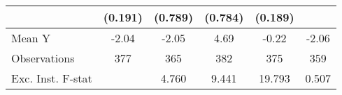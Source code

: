 {\begin{tabular}{l*{5}{c}}
            &     (0.191)         &     (0.789)         &     (0.784)         &     (0.189)         &                     \\
\midrule
Mean Y      &       -2.04         &       -2.05         &        4.69         &       -0.22         &       -2.06         \\
Observations&         377         &         365         &         382         &         375         &         359         \\
Exc. Inst. F-stat&                     &       4.760         &       9.441         &      19.793         &       0.507         \\
\bottomrule
\end{tabular}
}
